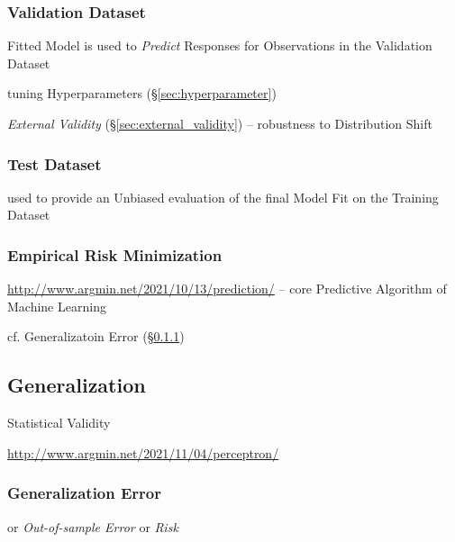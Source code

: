 \subsubsection{Validation Dataset}\label{sec:validation_dataset}

Fitted Model is used to \emph{Predict} Responses for Observations in the
Validation Dataset

tuning Hyperparameters (\S\ref{sec:hyperparameter})

\emph{External Validity} (\S\ref{sec:external_validity}) -- robustness to
Distribution Shift



\subsubsection{Test Dataset}\label{sec:test_dataset}

used to provide an Unbiased evaluation of the final Model Fit on the Training
Dataset



\subsubsection{Empirical Risk Minimization}\label{sec:empirical_risk}

\url{http://www.argmin.net/2021/10/13/prediction/} -- core Predictive Algorithm
of Machine Learning

cf. Generalizatoin Error (\S\ref{sec:generalization_error})



\subsection{Generalization}\label{sec:generalization}

Statistical Validity

\url{http://www.argmin.net/2021/11/04/perceptron/}



\subsubsection{Generalization Error}\label{sec:generalization_error}

or \emph{Out-of-sample Error} or \emph{Risk}


